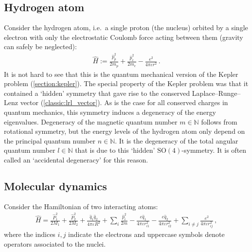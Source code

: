 
\subsection{Hydrogen atom}

    Consider the hydrogen atom, i.e.~a single proton (the nucleus) orbited by a single electron with only the electrostatic Coulomb force acting between them (gravity can safely be neglected):
    \begin{gather}
        \widehat{H} := \frac{\widehat{p}_p^2}{2m_p} + \frac{\widehat{p}_e^2}{2m_e} - \frac{e^2}{4\pi\varepsilon r^2}\,.
    \end{gather}
    It is not hard to see that this is the quantum mechanical version of the Kepler problem (\cref{section:kepler}). The special property of the Kepler problem was that it contained a `hidden' symmetry that gave rise to the conserved Laplace--Runge--Lenz vector (\cref{classic:lrl_vector}). As is the case for all conserved charges in quantum mechanics, this symmetry induces a degeneracy of the energy eigenvalues. Degeneracy of the magnetic quantum number $m\in\mathbb{N}$ follows from rotational symmetry, but the energy levels of the hydrogen atom only depend on the principal quantum number $n\in\mathbb{N}$. It is the degeneracy of the total angular quantum number $l\in\mathbb{N}$ that is due to this `hidden' $\mathrm{SO}(4)$-symmetry. It is often called an `accidental degeneracy' for this reason.


\subsection{Molecular dynamics}

    Consider the Hamiltonian of two interacting atoms:
    \begin{gather}
        \widehat{H} = \frac{\widehat{P}_1^2}{2M_1} + \frac{\widehat{P}_2^2}{2M_2} + \frac{\widehat{q}_1\widehat{q}_2}{4\pi\varepsilon R^2} + \sum_i\frac{\widehat{p}_i^2}{2m} - \frac{e\widehat{q}_1}{4\pi\varepsilon r_{i1}^2} - \frac{e\widehat{q}_2}{4\pi\varepsilon r_{i2}^2} + \sum_{i\neq j}\frac{e^2}{4\pi\varepsilon r_{ij}^2}\,,
    \end{gather}
    where the indices $i,j$ indicate the electrons and uppercase symbols denote operators associated to the nuclei.

